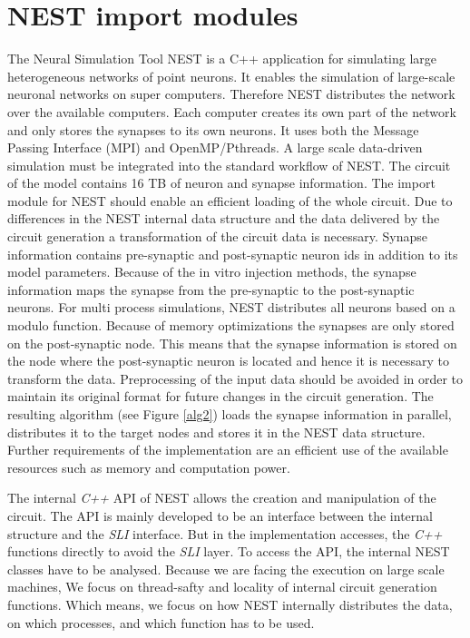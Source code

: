 \section{NEST import modules}
The Neural Simulation Tool NEST \cite{gewaltig2007nest} is a C++ application for simulating large heterogeneous networks of point neurons. It enables the simulation of large-scale neuronal networks on super computers. Therefore NEST distributes the network over the available computers. Each computer creates its own part of the network and only stores the synapses to its own neurons.
It uses both the Message Passing Interface (MPI) and OpenMP/Pthreads.
A large scale data-driven simulation must be integrated into the standard
workflow of NEST.
The circuit of the model contains 16 TB of neuron and synapse information.
The import module for NEST should enable an efficient loading of the whole circuit.
Due to differences in the NEST internal data structure and the data delivered by the
circuit generation a transformation of the circuit data is necessary.
Synapse information contains pre-synaptic and post-synaptic
neuron ids in addition to its model parameters.
Because of the in vitro injection
methods, the synapse information maps the synapse from the pre-synaptic to the
post-synaptic neurons. For multi process simulations, NEST distributes all neurons
based on a modulo function.
Because of memory optimizations
the synapses are only stored on the post-synaptic node. This means that the
synapse information is stored on the node where the post-synaptic neuron
is located and hence it is necessary to transform the data.
Preprocessing of the
input data should be avoided in order to maintain its original format for future changes in the circuit generation.
The resulting algorithm (see Figure \ref{alg2}) loads the synapse information in parallel, distributes it to the target nodes and stores it in the
NEST data structure.
Further requirements of the implementation are an efficient use of the available resources such as
memory and computation power.

The internal \emph{C++} API of NEST allows the creation and manipulation of the circuit.
The API is mainly developed to be an interface between the internal structure
and the \emph{SLI} interface. But in the implementation accesses, the \emph{C++} functions directly
to avoid the \emph{SLI} layer. To access the API, the internal NEST classes
have to be analysed. Because we are facing the execution on large scale machines,
We focus on thread-safty and locality of internal circuit generation functions.
Which means, we focus on how NEST internally distributes the data, on which processes, and which
function has to be used.


